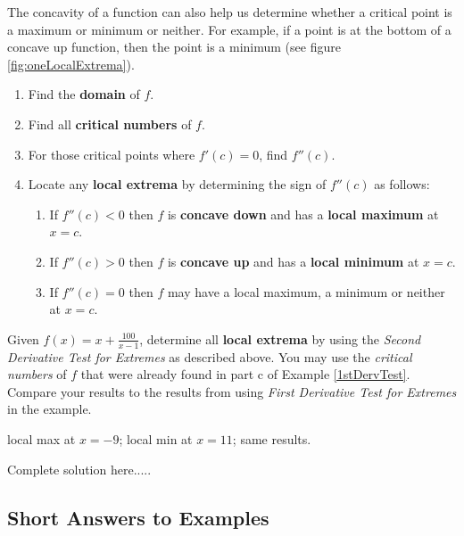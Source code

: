 \newpage
\noindent The concavity of a function can also help us determine whether a critical point is a maximum or minimum or neither. For example, if a point is at the bottom of a concave up function, then the point is a minimum (see figure \ref{fig:oneLocalExtrema}). 
\begin{tcolorbox}[title={The Second Derivative Test for Extremes:}]
\begin{enumerate}[leftmargin=*]
    \item Find the \textbf{domain} of $f$.
    \item Find all \textbf{critical numbers} of $f$.
    \item For those critical points where $f'(c)=0$, find $f''(c)$.
    \item Locate any \textbf{local extrema} by determining the sign of $f''(c)$ as follows:
    \renewcommand{\labelenumi}{(\alph{enumi})}
    \begin{enumerate}[leftmargin=*]
        \item If $f''(c)<0$ then $f$ is \textbf{concave down} and has a \textbf{local maximum} at $x=c$.
        \item If $f''(c)>0$ then $f$ is \textbf{concave up} and has a \textbf{local minimum} at $x=c$.
        \item If $f''(c)=0$ then $f$ may have a local maximum, a minimum or neither at $x=c$.
    \end{enumerate}
\end{enumerate}
\end{tcolorbox}
\vspace{-0.25cm}
\begin{example}
\noindent Given $f(x)=x+\displaystyle\frac{100}{x-1}$, determine all \textbf{local extrema} by using the \emph{Second Derivative Test for Extremes} as described above. You may use the \emph{critical numbers} of $f$ that were already found in part c of Example \ref{1stDervTest}. Compare your results to the results from using \emph{First Derivative Test for Extremes} in the example. 
    \begin{sol}
    local max at $x=-9$; local min at $x=11$; same results.
    \end{sol}
    \begin{solL}
    Complete solution here.....
    
    \end{solL}
\end{example}
\vspace{2in}



\vspace*{\fill}
\subsection*{Short Answers to Examples}





